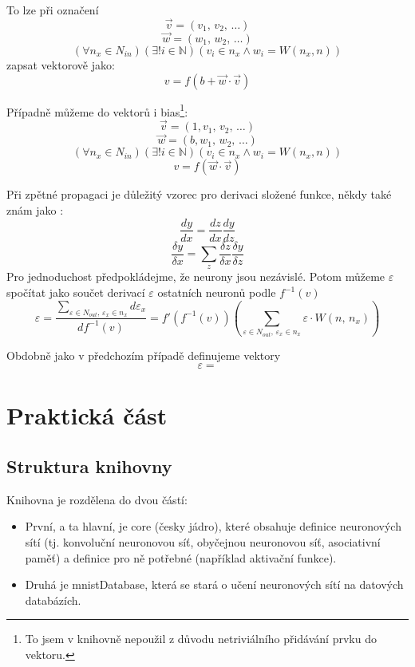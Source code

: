 \documentclass[12pt]{report}			%
\newcommand{\N}{\mathbb{N}}   			%
\begin{document}
				To lze při označení
				$$ \vec{v} = (v_{1},\,v_{2},\,\ldots) $$
				$$ \vec{w} = (w_{1},\,w_{2},\,\ldots) $$
				$$ \left(\forall n_x \in N_{in}\right)\left(\exists! i \in \N\right)\left(v_i \in n_x \land w_i = W(n_x, n)\right) $$
				zapsat vektorově jako:
				$$ v = f\left(b + \vec{w} \cdot \vec{v} \right) $$
				
				Případně můžeme do vektorů  i bias\footnote{To jsem v knihovně nepoužil z důvodu netriviálního přidávání prvku do vektoru.}:
				$$ \vec{v} = (1, v_{1},\,v_{2},\,\ldots) $$
				$$ \vec{w} = (b, w_{1},\,w_{2},\,\ldots) $$
				$$ \left(\forall n_x \in N_{in}\right)\left(\exists! i \in \N\right)\left(v_i \in n_x \land w_i = W(n_x, n)\right) $$
				$$ v = f\left(\vec{w} \cdot \vec{v} \right) $$
				
				Při zpětné propagaci je důležitý vzorec pro derivaci složené funkce, někdy také znám jako :
				$$ \frac{dy}{dx} = \frac{dz}{dx}\frac{dy}{dz} $$
				$$ \frac{\delta y}{\delta x} = \sum_z\frac{\delta z}{\delta x}\frac{\delta y}{\delta z} $$
				Pro jednoduchost předpokládejme, že neurony jsou nezávislé. Potom můžeme $\varepsilon$ spočítat jako součet derivací $\varepsilon$ ostatních neuronů podle $f^{-1}(v)$
				$$ \varepsilon = \frac{\sum_{\varepsilon \in N_{out},\,\varepsilon_x \in n_x} d\varepsilon_x}{df^{-1}(v)} = f'(f^{-1}(v)) \left(\sum_{\varepsilon \in N_{out},\,\varepsilon_x \in n_x} \varepsilon \cdot W\left(n,\,n_x\right)\right) $$
				
				Obdobně jako v předchozím případě definujeme vektory
				$$ \varepsilon = $$
				
			
		
	\part{Praktická část}
	
		\chapter{Struktura knihovny}
			Knihovna je rozdělena do dvou částí:
			\begin{itemize}
				\item První, a ta hlavní, je core (česky jádro), které obsahuje definice neuronových sítí (tj. konvoluční neuronovou síť, obyčejnou neuronovou síť, asociativní paměť) a definice pro ně potřebné (například aktivační funkce).
				\item Druhá je mnistDatabase, která se stará o učení neuronových sítí na datových databázích.
			\end{itemize}
			
\end{document}
